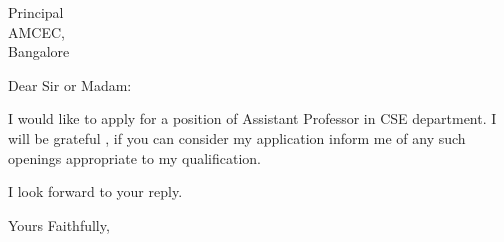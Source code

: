 \documentclass{letter}
\date{20 June,2020}
\begin{document}
\begin{letter}{Principal \\ AMCEC,\\ Bangalore
}
\opening{Dear Sir or Madam:}

I would like to apply for a position of Assistant Professor in CSE department. I will be grateful , if you can consider my application inform me of any such openings appropriate to my qualification.


I look forward to your reply.

\closing{Yours Faithfully,}





\end{letter}
\end{document}
